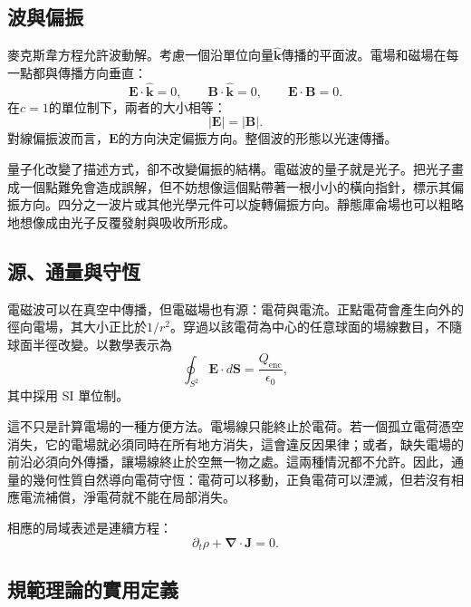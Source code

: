 \subsection{波與偏振}

麥克斯韋方程允許波動解。考慮一個沿單位向量\(\hat{\boldsymbol k}\)傳播的平面波。電場和磁場在每一點都與傳播方向垂直：
\begin{equation}
\boldsymbol E\cdot\hat{\boldsymbol k}=0,
\qquad
\boldsymbol B\cdot\hat{\boldsymbol k}=0,
\qquad
\boldsymbol E\cdot\boldsymbol B=0.
\end{equation}
在\(c=1\)的單位制下，兩者的大小相等：
\begin{equation}
|\boldsymbol E|=|\boldsymbol B|.
\end{equation}
對線偏振波而言，\(\boldsymbol E\)的方向決定偏振方向。整個波的形態以光速傳播。

量子化改變了描述方式，卻不改變偏振的結構。電磁波的量子就是光子。把光子畫成一個點難免會造成誤解，但不妨想像這個點帶著一根小小的橫向指針，標示其偏振方向。四分之一波片或其他光學元件可以旋轉偏振方向。靜態庫侖場也可以粗略地想像成由光子反覆發射與吸收所形成。

\subsection{源、通量與守恆}

電磁波可以在真空中傳播，但電磁場也有源：電荷與電流。正點電荷會產生向外的徑向電場，其大小正比於\(1/r^2\)。穿過以該電荷為中心的任意球面的場線數目，不隨球面半徑改變。以數學表示為
\begin{equation}
\oint_{S^2}\boldsymbol E\cdot d\boldsymbol S
=\frac{Q_{\mathrm{enc}}}{\epsilon_0},
\label{eq:l5-gauss}
\end{equation}
其中採用 SI 單位制。

這不只是計算電場的一種方便方法。電場線只能終止於電荷。若一個孤立電荷憑空消失，它的電場就必須同時在所有地方消失，這會違反因果律；或者，缺失電場的前沿必須向外傳播，讓場線終止於空無一物之處。這兩種情況都不允許。因此，通量的幾何性質自然導向電荷守恆：電荷可以移動，正負電荷可以湮滅，但若沒有相應電流補償，淨電荷就不能在局部消失。

相應的局域表述是連續方程：
\begin{equation}
\partial_t\rho+\boldsymbol\nabla\cdot\boldsymbol J=0.
\label{eq:l5-continuity}
\end{equation}

\subsection{規範理論的實用定義}

